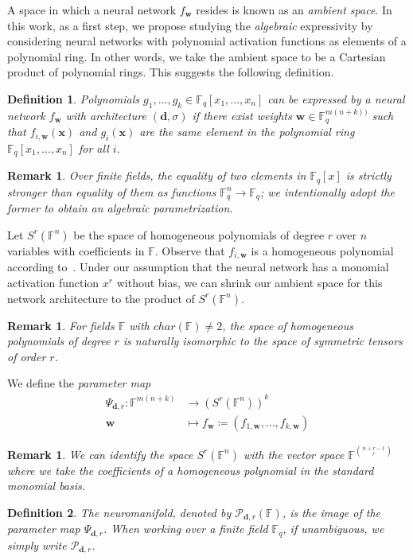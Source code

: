 \documentclass[a4paper]{cas-sc}
\newcommand{\xx}{\textbf{x}}    %
\newcommand{\ww}{\mathbf{w}}    %
\newcommand{\dd}{\mathbf{d}}    %
\newcommand{\F}{\mathbb{F}}
\newtheorem{definition}{Definition}[section]
\newtheorem{remark}[theorem]{Remark}
\begin{document}
    A space in which a neural network $f_{\ww}$ resides is known as an \textit{ambient space}. In this work, as a first step, we propose studying the \textit{algebraic} expressivity by considering neural networks with polynomial activation functions as elements of a polynomial ring. In other words, we take the ambient space to be a Cartesian product of polynomial rings. This suggests the following definition.
    \begin{definition}
        Polynomials $g_1,\dots,g_k \in \F_q[x_1,\dots,x_n]$ can be \textit{expressed} by a neural network $f_{\ww}$ with architecture $(\dd,\sigma)$ if there exist weights $\ww\in\F_q^{m(n+k))}$
        such that $f_{i,\ww}(\xx)$ and $g_{i}(\xx)$ are the same element in the polynomial ring $\F_q[x_1,\dots,x_n]$ for all $i$.
    \end{definition}
    \begin{remark}
        Over finite fields, the equality of two elements in $\mathbb{F}_q[x]$ is strictly stronger than equality of them as functions $\mathbb{F}_q^n \to \mathbb{F}_q$; we intentionally adopt the former to obtain an algebraic parametrization.
    \end{remark}
    
    Let $S^r(\F^n)$ be the space of homogeneous polynomials of degree $r$ over $n$ variables with coefficients in $\F$. Observe that $f_{i,\ww}$ is a homogeneous polynomial according to~. Under our assumption that the neural network has a monomial activation function $x^r$ without bias, we can shrink our ambient space for this network architecture to the product of $S^r(\F^n)$.

    \begin{remark}
         For fields $\F$ with $char(\F) \neq 2$, the space of homogeneous polynomials of degree $r$ is naturally isomorphic to the space of symmetric tensors of order $r$.
    \end{remark}
    
    
    We define the \textit{parameter map}
    \begin{equation}
        \begin{aligned}
            \Psi_{\dd, r}: \F^{m(n+k)} & \rightarrow (S^r(\F^n))^k \\
            \ww &\mapsto f_{\ww}\coloneq(f_{1,\ww},\dots,f_{k,\ww})
        \end{aligned}
    \end{equation}
    
    \begin{remark}
        We can identify the space $S^r(\F^n)$ with the vector space $\F^{{\binom{n+r-1} {r}}}$ where we take the coefficients of a homogeneous polynomial in the standard monomial basis.
    \end{remark}
    \begin{definition}
        The \textit{neuromanifold}, denoted by $\mathcal{P}_{\dd,r}(\F)$, is the image of the parameter map $\Psi_{\dd,r}$.
        When working over a finite field $\F_q$, if unambiguous, we simply write $\mathcal{P}_{\dd,r}$.
    \end{definition}
\end{document}
